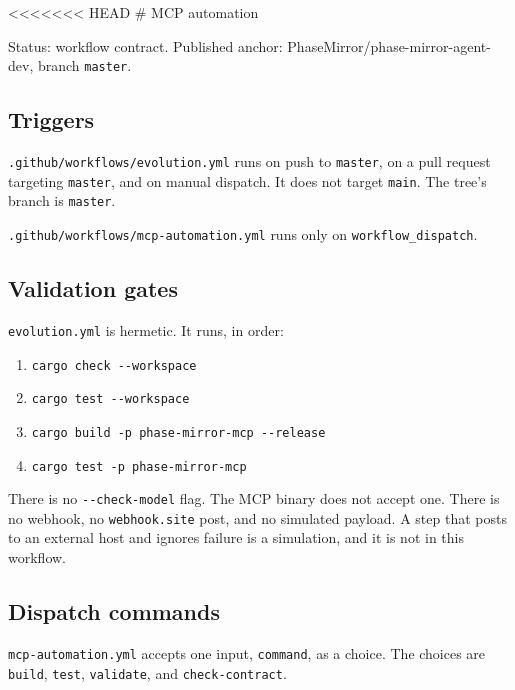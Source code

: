 \documentclass[
]{article}
\author{}
\date{}
\providecommand{\tightlist}{%
  \setlength{\itemsep}{0pt}\setlength{\parskip}{0pt}}
\begin{document}
\textless\textless\textless\textless\textless\textless\textless{} HEAD
\# MCP automation

Status: workflow contract. Published anchor:
PhaseMirror/phase-mirror-agent-dev, branch \texttt{master}.

\hypertarget{triggers}{%
\subsection{Triggers}\label{triggers}}

\texttt{.github/workflows/evolution.yml} runs on push to
\texttt{master}, on a pull request targeting \texttt{master}, and on
manual dispatch. It does not target \texttt{main}. The tree's branch is
\texttt{master}.

\texttt{.github/workflows/mcp-automation.yml} runs only on
\texttt{workflow\_dispatch}.

\hypertarget{validation-gates}{%
\subsection{Validation gates}\label{validation-gates}}

\texttt{evolution.yml} is hermetic. It runs, in order:

\begin{enumerate}
\def\labelenumi{\arabic{enumi}.}
\tightlist
\item
  \texttt{cargo\ check\ -\/-workspace}
\item
  \texttt{cargo\ test\ -\/-workspace}
\item
  \texttt{cargo\ build\ -p\ phase-mirror-mcp\ -\/-release}
\item
  \texttt{cargo\ test\ -p\ phase-mirror-mcp}
\end{enumerate}

There is no \texttt{-\/-check-model} flag. The MCP binary does not
accept one. There is no webhook, no \texttt{webhook.site} post, and no
simulated payload. A step that posts to an external host and ignores
failure is a simulation, and it is not in this workflow.

\hypertarget{dispatch-commands}{%
\subsection{Dispatch commands}\label{dispatch-commands}}

\texttt{mcp-automation.yml} accepts one input, \texttt{command}, as a
choice. The choices are \texttt{build}, \texttt{test},
\texttt{validate}, and \texttt{check-contract}.
\end{document}
